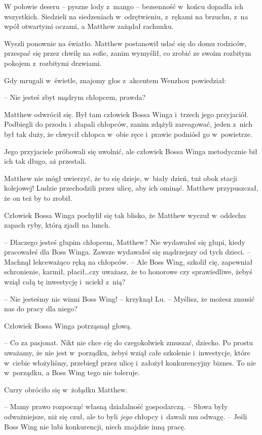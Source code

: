 \documentclass[oneside,polish,11pt,rmheadings]{mwbk}
\begin{document}
W połowie deseru -- pyszne lody z~mango -- bezsenność w~końcu dopadła ich wszystkich. Siedzieli na siedzeniach w~odrętwieniu, z~rękami na brzuchu, z~na wpół otwartymi oczami, a Matthew zażądał rachunku. 


Wyszli ponownie na światło. Matthew postanowił udać się do domu rodziców, przespać się przez chwilę na sofie, zanim wymyślił, co zrobić ze swoim rozbitym pokojem z~rozbitymi drzwiami. 


Gdy mrugali w~świetle, znajomy głos z~akcentem Wenzhou powiedział: 

-- Nie jesteś zbyt mądrym chłopcem, prawda? 


Matthew odwrócił się. Był tam człowiek Bossa Winga i~trzech jego przyjaciół. Podbiegli do przodu i~złapali chłopców, zanim zdążyli zareagować, jeden z~nich był tak duży, że chwycił chłopca w~obie ręce i~prawie podniósł go w~powietrze. 


Jego przyjaciele próbowali się uwolnić, ale człowiek Bossa Winga metodycznie bił ich tak długo, aż przestali. 


Matthew nie mógł uwierzyć, że to się dzieje, w~biały dzień, tuż obok stacji kolejowej! Ludzie przechodzili przez ulicę, aby ich ominąć. Matthew przypuszczał, że on też by to zrobił. 


Człowiek Bossa Winga pochylił się tak blisko, że Matthew wyczuł w~oddechu zapach ryby, którą zjadł na lunch. 

-- Dlaczego jesteś głupim chłopcem, Matthew? Nie wydawałeś się głupi, kiedy pracowałeś dla Boss Winga. Zawsze wydawałeś się mądrzejszy od tych dzieci. -- Machnął lekceważąco ręką na chłopców. -- Ale Boss Wing, szkolił cię, zapewniał schronienie, karmił, płacił\ldots  czy uważasz, że to honorowe czy sprawiedliwe, żebyś wziął całą tę inwestycję i~uciekł z~nią? 


-- Nie jesteśmy nic winni Boss Wing! -- krzyknął Lu. -- Myślisz, że możesz zmusić nas do pracy dla niego? 


Człowiek Bossa Winga potrząsnął głową. 

-- Co za pasjonat. Nikt nie chce cię do czegokolwiek zmuszać, dziecko. Po prostu uważamy, że nie jest w~porządku, żebyś wziął całe szkolenie i~inwestycje, które w~ciebie włożyliśmy, przebiegł przez ulicę i~założył konkurencyjny biznes. To nie w~porządku, a Boss Wing tego nie toleruje. 


Curry obróciło się w~żołądku Matthew. 

-- Mamy prawo rozpocząć własną działalność gospodarczą. -- Słowa były odważniejsze, niż się czuł, ale to byli \textit{jego }chłopcy i~dawali mu odwagę. -- Jeśli Boss Wing nie lubi konkurencji, niech znajdzie inną pracę. 
\end{document}
